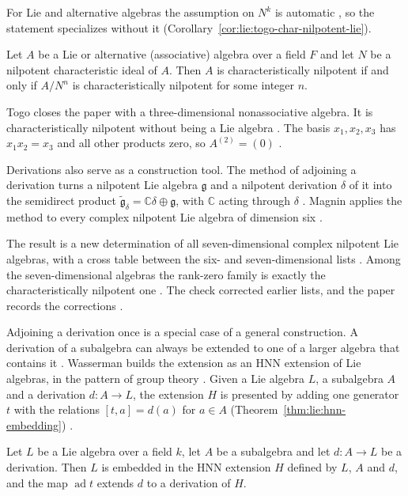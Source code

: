 For Lie and alternative algebras the assumption on $N^{k}$ is automatic
\cite[p.~211]{Togo1969}, so the statement specializes without it (Corollary~\ref{cor:lie:togo-char-nilpotent-lie}).

\begin{corollary}\label{cor:lie:togo-char-nilpotent-lie}
Let $A$ be a Lie or alternative (associative) algebra over a field $F$
and let $N$ be a nilpotent characteristic ideal of $A$.  Then $A$ is
characteristically nilpotent if and only if $A/N^{n}$ is characteristically
nilpotent for some integer $n$.
\end{corollary}

Togo closes the paper with a three-dimensional nonassociative algebra.
It is characteristically nilpotent without being a Lie algebra
\cite[p.~211]{Togo1969}.  The basis $x_1,x_2,x_3$ has $x_1x_2=x_3$ and
all other products zero, so $A^{(2)}=(0)$
\cite[p.~211]{Togo1969}.

Derivations also serve as a construction tool. The
method of adjoining a derivation turns a nilpotent Lie algebra
$\mathfrak{g}$ and a nilpotent derivation $\delta$ of it into the semidirect
product $\widetilde{\mathfrak{g}}_\delta=\mathbb{C}\delta\oplus\mathfrak{g}$,
with $\mathbb{C}$ acting through $\delta$ \cite[p.~724]{Magnin2009}. Magnin
applies the method to every complex nilpotent Lie algebra of dimension six
\cite[p.~724]{Magnin2009}.

The result is a new determination of all seven-dimensional complex nilpotent Lie
algebras, with a cross table between the six- and seven-dimensional lists
\cite[p.~724]{Magnin2009}. Among the seven-dimensional algebras the rank-zero
family is exactly the characteristically nilpotent one
\cite[p.~726]{Magnin2009}. The check corrected earlier lists, and the paper
records the corrections \cite[p.~724]{Magnin2009}.

Adjoining a derivation once is a special case of a general construction. A
derivation of a subalgebra can always be extended to one of a larger algebra
that contains it \cite[Corollary~5.2, p.~84]{Wasserman1998}. Wasserman builds the
extension as an HNN extension of Lie algebras, in the pattern of group theory
\cite[p.~79]{Wasserman1998}. Given a Lie algebra $L$, a subalgebra $A$ and a
derivation $d\colon A\to L$, the extension $H$ is presented by adding one
generator $t$ with the relations $[t,a]=d(a)$ for $a\in A$ (Theorem~\ref{thm:lie:hnn-embedding})
\cite[p.~83]{Wasserman1998}.\begin{theorem}\label{thm:lie:hnn-embedding}
Let $L$ be a Lie algebra over a field $k$, let $A$ be a subalgebra and let
$d\colon A\to L$ be a derivation. Then $L$ is embedded in the HNN extension $H$
defined by $L$, $A$ and $d$, and the map $\operatorname{ad}t$ extends $d$ to a
derivation of $H$.
\end{theorem}

